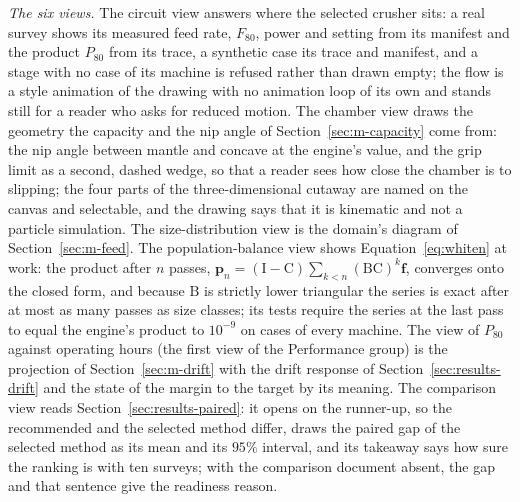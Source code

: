 \emph{The six views.} The circuit view answers where the selected crusher sits: a real survey shows its measured feed rate, $F_{80}$,
power and setting from its manifest and the product $P_{80}$ from its trace, a synthetic case its trace and manifest, and a stage with
no case of its machine is refused rather than drawn empty; the flow is a style animation of the drawing with no animation loop of its
own and stands still for a reader who asks for reduced motion. The chamber view draws the geometry the capacity and the nip angle of
Section~\ref{sec:m-capacity} come from: the nip angle between mantle and concave at the engine's value, and the grip limit as a second,
dashed wedge, so that a reader sees how close the chamber is to slipping; the four parts of the three-dimensional cutaway are named on
the canvas and selectable, and the drawing says that it is kinematic and not a particle simulation. The size-distribution view is the
domain's diagram of Section~\ref{sec:m-feed}. The population-balance view shows Equation~\eqref{eq:whiten} at work: the product after
$n$ passes, $\mathbf p_n=(\mathrm I-\mathrm C)\sum_{k<n}(\mathrm B\mathrm C)^k\mathbf f$, converges onto the closed form, and because
$\mathrm B$ is strictly lower triangular the series is exact after at most as many passes as size classes; its tests require the
series at the last pass to equal the engine's product to $10^{-9}$ on cases of every machine. The view of $P_{80}$ against operating hours (the first view of the Performance group)
is the projection of
Section~\ref{sec:m-drift} with the drift response of Section~\ref{sec:results-drift} and the state of the margin to the target by its
meaning. The comparison view reads Section~\ref{sec:results-paired}: it opens on the runner-up, so the recommended and the selected
method differ, draws the paired gap of the selected method as its mean and its $95\%$ interval, and its takeaway says how sure the
ranking is with ten surveys; with the comparison document absent, the gap and that sentence give the readiness reason.

